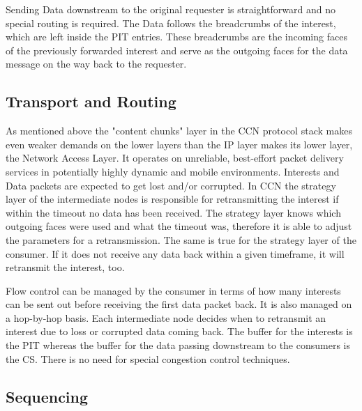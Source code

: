 \vspace{5mm} %

Sending Data downstream to the original requester is straightforward and no special routing is required. The Data follows the breadcrumbs of the interest, which are left inside the PIT entries. These breadcrumbs are the incoming faces of the previously forwarded interest and serve as the outgoing faces for the data message on the way back to the requester.

\subsection{Transport and Routing}

As mentioned above the "content chunks" layer in the CCN protocol stack makes even weaker demands on the lower layers than the IP layer makes its lower layer, the Network Access Layer. It operates on unreliable, best-effort packet delivery services in potentially highly dynamic and mobile environments. Interests and Data packets are expected to get lost and/or corrupted. In CCN the strategy layer of the intermediate nodes is responsible for retransmitting the interest if within the timeout no data has been received. The strategy layer knows which outgoing faces were used and what the timeout was, therefore it is able to adjust the parameters for a retransmission. The same is true for the strategy layer of the consumer. If it does not receive any data back within a given timeframe, it will retransmit the interest, too.

\vspace{5mm} %

Flow control can be managed by the consumer in terms of how many interests can be sent out before receiving the first data packet back. It is also managed on a hop-by-hop basis. Each intermediate node decides when to retransmit an interest due to loss or corrupted data coming back. The buffer for the interests is the PIT whereas the buffer for the data passing downstream to the consumers is the CS. There is no need for special congestion control techniques.

\subsection{Sequencing}

